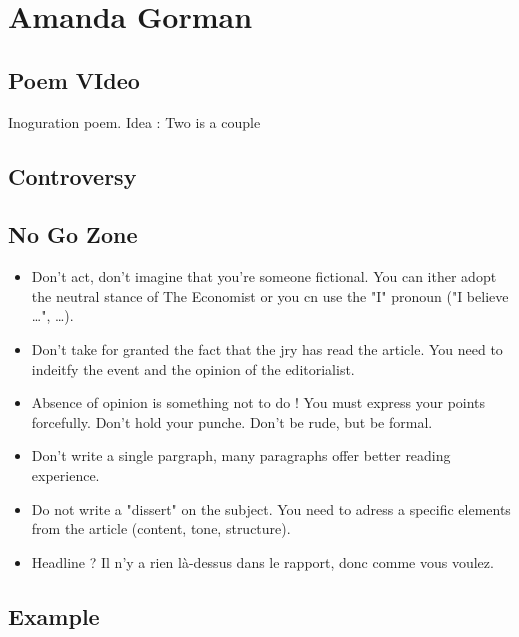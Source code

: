 \documentclass[a4paper,english,bookmarks]{article}
\begin{document}

\newboxans

\section{Amanda Gorman}

\subsection{Poem VIdeo}

Inoguration poem. Idea : Two is a couple

\subsection{Controversy}

\subsection{No Go Zone}

\begin{itemize}
    \item Don't act, don't imagine that you're someone fictional. You can ither adopt the neutral stance of The Economist or you cn use the "I" pronoun ("I believe \dots", \dots).
    
    \item Don't take for granted the fact that the jry has read the article. You need to indeitfy the event and the opinion of the editorialist.
    
    \item Absence of opinion is something not to do ! You must express your points forcefully. Don't hold your punche. Don't be rude, but be formal.
    
    \item Don't write a single pargraph, many paragraphs offer better reading experience.
    
    \item Do not write a "dissert" on the subject. You need to adress a specific elements from the article (content, tone, structure).
    
    \item Headline ? Il n'y a rien là-dessus dans le rapport, donc comme vous voulez.
\end{itemize}

\subsection{Example}
\end{document}
